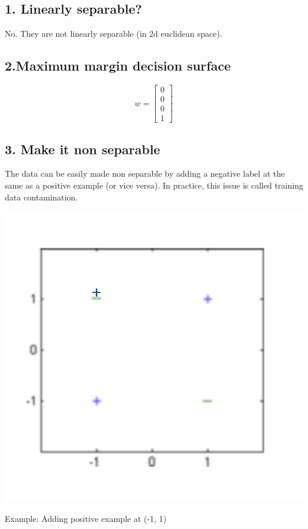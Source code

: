 \documentclass[letterpaper,doc,notimes]{apa6}
\begin{document}
\subsection{1. Linearly separable?}
No. They are not linearly separable (in 2d euclidean space).

\subsection{2.Maximum margin decision surface}
$$w = \begin{bmatrix}
	0 \\ 0 \\ 0 \\ 1
\end{bmatrix} $$
 \subsection{3.  Make it  non separable}
The data can be easily made non separable by adding a negative label at the same as a positive example (or vice versa). In practice, this issue is called training data contamination.
\begin{minipage}{0.3\textwidth}
\includegraphics[scale=0.4]{4c}
\end{minipage}
\begin{minipage}{0.6\textwidth}\raggedleft
 Example: Adding positive example at (-1, 1)
\end{minipage}
\end{document}
